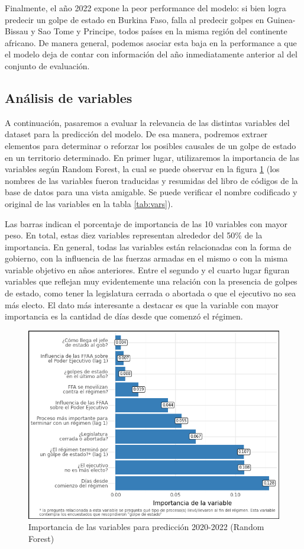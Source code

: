 \documentclass{article}
\begin{document}
Finalmente, el año 2022 expone la peor performance del modelo: si bien logra predecir
un golpe de estado en Burkina Faso, falla al predecir golpes en Guinea-Bissau y Sao Tome
y Principe, todos países en la misma región del continente africano. De manera general, 
podemos asociar esta baja en la performance a que el modelo deja de contar con
información del año inmediatamente anterior al del conjunto de evaluación.

\subsection{Análisis de variables}
A continuación, pasaremos a evaluar la relevancia de las distintas variables del dataset
para la predicción del modelo. De esa manera, podremos extraer elementos para determinar
o reforzar los posibles causales de un golpe de estado en un territorio determinado. En 
primer lugar, utilizaremos la importancia de las variables según Random Forest, la cual
se puede observar en la figura \ref{fig:feat_imp} (los nombres de las variables fueron
traducidas y resumidas del libro de códigos de la base de datos para una vista amigable.
Se puede verificar el nombre codificado y original de las variables en la tabla \ref{tab:vars}). 

Las barras indican el porcentaje de
importancia de las 10 variables con mayor peso. En total, estas diez variables representan
alrededor del 50\% de la importancia. En general, todas las variables están relacionadas 
con la forma de gobierno, con la influencia de las fuerzas armadas en el mismo o con la 
misma variable objetivo en años anteriores.
Entre el segundo y el cuarto lugar figuran variables
que reflejan muy evidentemente una relación con la presencia de golpes de estado, como 
tener la legislatura cerrada o abortada o que el ejecutivo no sea más electo. El dato más
interesante a destacar es que la variable con mayor importancia es la cantidad de días desde que
comenzó el régimen.

\begin{figure}[H]
  \centering  
  \includegraphics[width=1\textwidth]{8_feature_importance.png}
  \caption{Importancia de las variables para predicción 2020-2022 (Random Forest) \label{fig:feat_imp}}
\end{figure}
\end{document}
